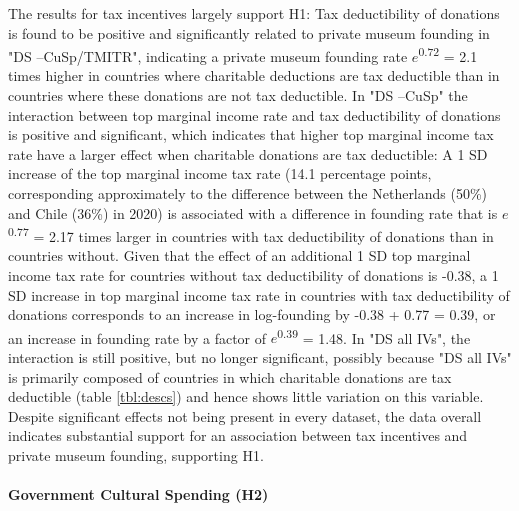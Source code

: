 \documentclass[11pt]{article}
\begin{document}
The results for tax incentives largely support H1: 
Tax deductibility of donations is found to be positive and significantly related to private museum founding in "DS --CuSp/TMITR", indicating a private museum founding rate \(e\)\textsuperscript{0.72} = 2.1 times higher in countries where charitable deductions are tax deductible than in countries where these donations are not tax deductible.
In "DS --CuSp" the interaction between top marginal income rate and tax deductibility of donations is positive and significant, which indicates that higher top marginal income tax rate have a larger effect when charitable donations are tax deductible:
A 1 SD increase of the top marginal income tax rate (14.1 percentage points, corresponding approximately to the difference between the Netherlands (50\%) and Chile (36\%) in 2020) is associated with a difference in founding rate that is \(e\)\textsuperscript{0.77} = 2.17 times larger in countries with tax deductibility of donations than in countries without.
Given that the effect of an additional 1 SD top marginal income tax rate for countries without tax deductibility of donations is -0.38, a 1 SD increase in top marginal income tax rate in countries with tax deductibility of donations corresponds to an increase in log-founding by -0.38 + 0.77 = 0.39, or an increase in founding rate by a factor of \(e\)\textsuperscript{0.39} = 1.48. 
In "DS all IVs", the interaction is still positive, but no longer significant, possibly because "DS all IVs" is primarily composed of countries in which charitable donations are tax deductible (table \ref{tbl:descs}) and hence shows little variation on this variable. 
Despite significant effects not being present in every dataset, the data overall indicates substantial support for an association between tax incentives and private museum founding, supporting H1. 


\paragraph*{Government Cultural Spending (H2)}
\end{document}
